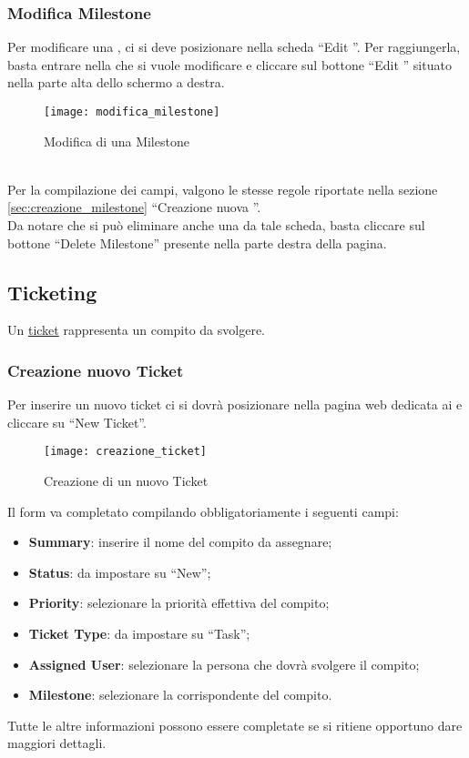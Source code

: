 \subsubsection{Modifica Milestone}
Per modificare una , ci si deve posizionare nella scheda ``Edit ''. Per raggiungerla, basta entrare nella  che si vuole modificare e cliccare sul bottone ``Edit '' situato nella parte alta dello schermo a destra.
\begin{figure}[h]
\texttt{[image: modifica\_milestone]}
\caption{Modifica di una Milestone} \label{fig:modifica_milestone}
\end{figure}
\\Per la compilazione dei campi, valgono le stesse regole riportate nella sezione \ref{sec:creazione_milestone} ``Creazione nuova ''.
\\Da notare che si può eliminare anche una  da tale scheda, basta cliccare sul bottone ``Delete Milestone'' presente nella parte destra della pagina.

\subsection{Ticketing}
Un \underline{ticket} rappresenta un compito da svolgere.

\subsubsection{Creazione nuovo Ticket}
\label{sec:creazione_ticket}
Per inserire un nuovo ticket ci si dovrà posizionare nella pagina web dedicata ai  e cliccare su ``New Ticket''.
\begin{figure}[h]
\texttt{[image: creazione\_ticket]}
\caption{Creazione di un nuovo Ticket} \label{fig:creazione_ticket}
\end{figure}
Il form va completato compilando obbligatoriamente i seguenti campi:
\begin{itemize}
\item \textbf{Summary}: inserire il nome del compito da assegnare;
\item \textbf{Status}: da impostare su ``New'';
\item \textbf{Priority}: selezionare la priorità effettiva del compito;
\item \textbf{Ticket Type}: da impostare su ``Task'';
\item \textbf{Assigned User}: selezionare la persona che dovrà svolgere il compito;
\item \textbf{Milestone}: selezionare la  corrispondente del compito.
\end{itemize}
Tutte le altre informazioni possono essere completate se si ritiene opportuno dare maggiori dettagli.

